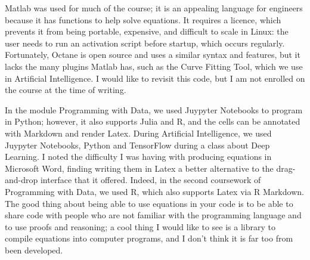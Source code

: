 \documentclass{article}
\begin{document}
Matlab was used for much of the course; it is an appealing language for engineers because it has functions to help solve equations. It requires a licence, which prevents it from being portable, expensive, and difficult to scale in Linux: the user needs to run an activation script before startup, which occurs regularly. Fortunately, Octane is open source and uses a similar syntax and features, but it lacks the many plugins Matlab has, such as the Curve Fitting Tool, which we use in Artificial Intelligence. I would like to revisit this code, but I am not enrolled on the course at the time of writing.

In the module Programming with Data, we used Juypyter Notebooks to program in Python; however, it also supports Julia and R, and the cells can be annotated with Markdown and render Latex. During Artificial Intelligence, we used Juypyter Notebooks, Python and TensorFlow during a class about Deep Learning. I noted the difficulty I was having with producing equations in Microsoft Word, finding writing them in Latex a better alternative to the drag-and-drop interface that it offered. Indeed, in the second coursework of Programming with Data, we used  R, which also supports Latex via R Markdown. The good thing about being able to use equations in your code is to be able to share code with people who are not familiar with the programming language and to use proofs and reasoning; a cool thing I would like to see is a library to compile equations into computer programs, and I don't think it is far too from been developed.

\newpage

 
\end{document}
